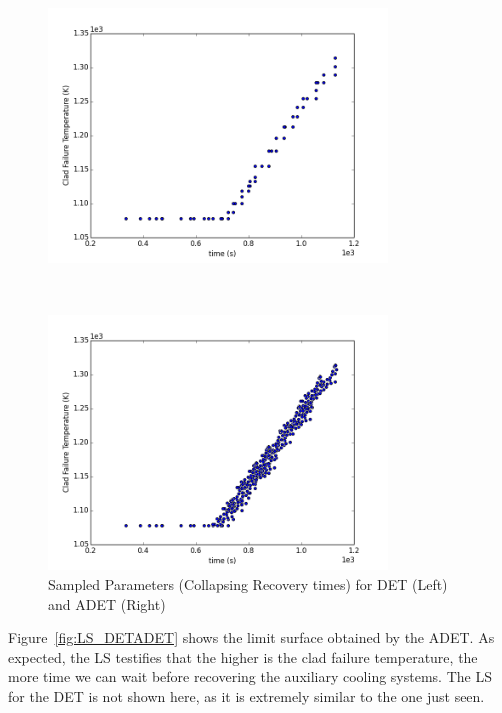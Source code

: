 \begin{figure}[h]
 \begin{minipage}[b]{8.5cm}
   \centering
   \includegraphics[width=9cm]{figures/sampledcollapsed_det.png}
 \end{minipage}
 \ \hspace{2mm} \hspace{3mm} \
 \begin{minipage}[b]{8.5cm}
   \centering
   \includegraphics[width=9cm]{figures/sampledcollapsed_adaptivedet.png}
 \end{minipage}
\caption{Sampled Parameters (Collapsing Recovery times) for DET (Left) and ADET (Right)}
\label{fig:SampledCollapsed}
\end{figure}
Figure~\ref{fig:LS_DETADET} shows the limit surface obtained by the ADET. As expected, the LS testifies that the higher is the clad failure temperature, the more time we can wait before recovering the auxiliary cooling systems.  The LS for the DET is not shown here, as it is extremely similar to the one just seen.
